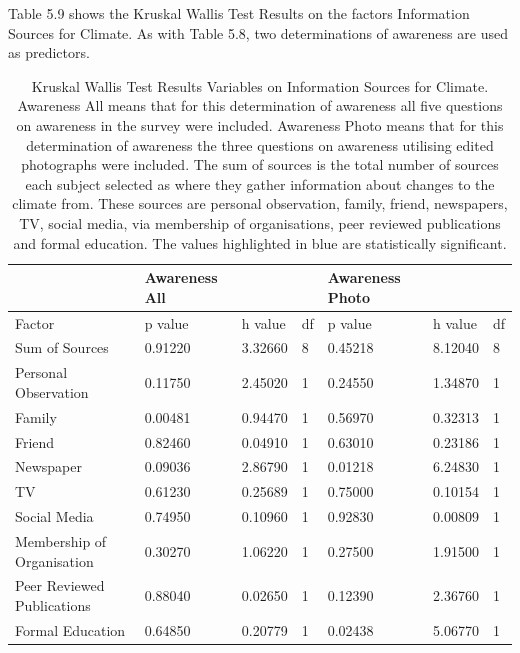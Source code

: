 Table 5.9 shows the Kruskal Wallis Test Results on the factors Information Sources for Climate. As with Table 5.8, two determinations of awareness are used as predictors.



\begin{table}[H]
    \centering
    \begin{tabular}{|l|l|l|l|l|l|l|}
    \hline
        & \textbf{Awareness All} & ~ & ~ & \textbf{Awareness Photo} & ~ & ~ \\ \hline
        Factor & p value & h value & df & p value & h value & df \\ \hline
        Sum of Sources & 0.91220 & 3.32660 & 8 & 0.45218 & 8.12040 & 8 \\ \hline
        Personal Observation & 0.11750 & 2.45020 & 1 & 0.24550 & 1.34870 & 1 \\ \hline
        Family & \cellcolor[HTML]{7df9ff} 0.00481 & 0.94470 & 1 & 0.56970 & 0.32313 & 1 \\ \hline
        Friend & 0.82460 & 0.04910 & 1 & 0.63010 & 0.23186 & 1 \\ \hline
        Newspaper & 0.09036 & 2.86790 & 1 & \cellcolor[HTML]{7df9ff} 0.01218 & 6.24830 & 1 \\ \hline
        TV & 0.61230 & 0.25689 & 1 & 0.75000 & 0.10154 & 1 \\ \hline
        Social Media & 0.74950 & 0.10960 & 1 & 0.92830 & 0.00809 & 1 \\ \hline
        Membership of Organisation & 0.30270 & 1.06220 & 1 & 0.27500 & 1.91500 & 1 \\ \hline
        Peer Reviewed Publications  & 0.88040 & 0.02650 & 1 & 0.12390 & 2.36760 & 1 \\ \hline
        Formal Education & 0.64850 & 0.20779 & 1 & \cellcolor[HTML]{7df9ff} 0.02438 & 5.06770 & 1 \\ \hline
    \end{tabular}
    \caption{Kruskal Wallis Test Results Variables on Information Sources for Climate. Awareness All means that for this determination of awareness all five questions on awareness in the survey were included. Awareness Photo means that for this determination of awareness the three questions on awareness utilising edited photographs were included. The sum of sources is the total number of sources each subject selected as where they gather information about changes to the climate from. These sources are personal observation, family, friend, newspapers, TV, social media, via membership of organisations, peer reviewed publications and formal education. The values highlighted in blue are statistically significant. }
    \label{Kruskal_wallis_test_information}
\end{table}

